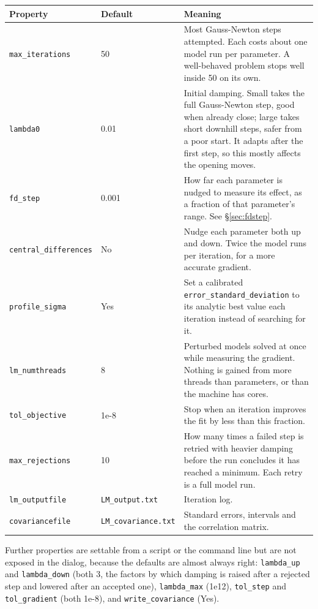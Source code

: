 \documentclass[11pt,a4paper]{article}
\newcommand{\code}[1]{\texttt{\small #1}}
\begin{document}
\begin{longtable}{@{}L{0.25\textwidth}L{0.19\textwidth}L{0.50\textwidth}@{}}
\toprule
\textbf{Property} & \textbf{Default} & \textbf{Meaning} \\
\midrule
\endhead
\code{max\_iterations} & 50 &
  Most Gauss-Newton steps attempted. Each costs about one model run per
  parameter. A well-behaved problem stops well inside 50 on its own. \\
\code{lambda0} & 0.01 &
  Initial damping. Small takes the full Gauss-Newton step, good when already
  close; large takes short downhill steps, safer from a poor start. It adapts
  after the first step, so this mostly affects the opening moves. \\
\code{fd\_step} & 0.001 &
  How far each parameter is nudged to measure its effect, as a fraction of that
  parameter's range. See \S\ref{sec:fdstep}. \\
\code{central\_differences} & No &
  Nudge each parameter both up and down. Twice the model runs per iteration,
  for a more accurate gradient. \\
\code{profile\_sigma} & Yes &
  Set a calibrated \code{error\_standard\_deviation} to its analytic best value
  each iteration instead of searching for it. \\
\code{lm\_numthreads} & 8 &
  Perturbed models solved at once while measuring the gradient. Nothing is
  gained from more threads than parameters, or than the machine has cores. \\
\code{tol\_objective} & 1e-8 &
  Stop when an iteration improves the fit by less than this fraction. \\
\code{max\_rejections} & 10 &
  How many times a failed step is retried with heavier damping before the run
  concludes it has reached a minimum. Each retry is a full model run. \\
\code{lm\_outputfile} & \texttt{\scriptsize LM\_output.txt} &
  Iteration log. \\
\code{covariancefile} & \texttt{\scriptsize LM\_covariance.txt} &
  Standard errors, intervals and the correlation matrix. \\
\bottomrule
\end{longtable}


\noindent Further properties are settable from a script or the command
line but are not exposed in the dialog, because the defaults are almost always
right: \code{lambda\_up} and \code{lambda\_down} (both 3, the factors by which
damping is raised after a rejected step and lowered after an accepted one),
\code{lambda\_max} (1e12), \code{tol\_step} and \code{tol\_gradient} (both
1e-8), and \code{write\_covariance} (Yes).
\end{document}
